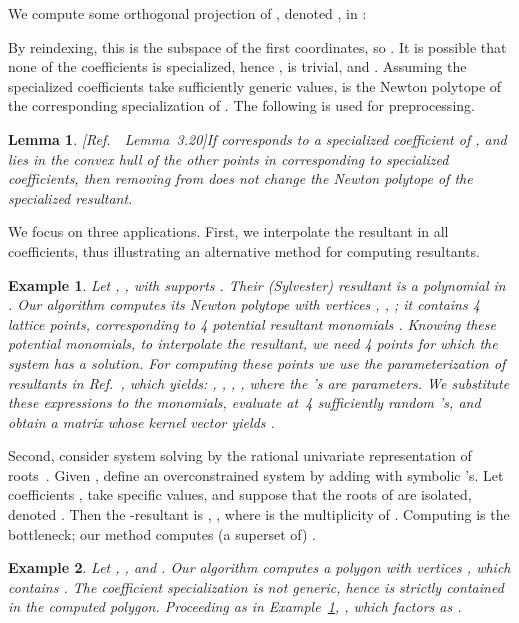 \documentclass{article}
\newtheorem{example}{Example}
\newtheorem{lemma}{Lemma}
\newcommand\refcite[1]{\citealp{#1}} \newcommand\citess[1]{\textsuperscript{\textup{\citealp{#1}}}}
\begin{document}
We compute some orthogonal projection of , denoted
, in :

By reindexing, this is the subspace of the first  coordinates,
so\linebreak
.
It is possible that none of the coefficients  is specialized,
hence ,  is trivial, and .
Assuming the specialized coefficients take sufficiently
generic values,  is the Newton polytope of the corresponding
specialization of .
The following is used for preprocessing.

\begin{lemma}{\rm [Ref.~\refcite{JensenYu11}~Lemma~3.20]}\label{Linsidepoints}
If  corresponds to a specialized coefficient of ,
and lies in the convex hull of the other points in  corresponding
to specialized coefficients, then removing  from  does not
change the Newton polytope of the specialized resultant.
\end{lemma} 

We focus on three applications. First,
we interpolate the resultant in all coefficients, thus illustrating
an alternative method for computing resultants.
\begin{example}\label{ExamGenRes}
Let , , with supports
.
Their (Sylvester) resultant is a polynomial in  .
Our algorithm computes its Newton polytope with vertices
,  , ;
it contains 4 lattice points, corresponding to 4 potential resultant monomials
.
Knowing these potential monomials, to interpolate the resultant, we need 4 
points 
for which the system  has a solution.
For computing these points we use the
parameterization 
of resultants in Ref.~\refcite{Kap91}, which yields:
,  ,
, , 
where the 's are parameters.
We substitute these expressions to the monomials,
evaluate at~4 sufficiently random 's, and obtain a matrix
whose kernel vector  yields
.
\end{example}

Second, consider system solving by the
rational univariate representation of roots~\citess{BaPoRo}. 
Given ,
define an overconstrained system by adding
 with symbolic 's.
Let coefficients , take specific values,
and suppose that the roots of  are isolated, denoted
.
Then the -resultant is
, 
, where  is the multiplicity of .
Computing  is the bottleneck; our method computes 
(a superset of) .

\begin{example}\label{ExamUres}
Let , , and .
Our algorithm computes a polygon with vertices 
, which contains . 
The coefficient specialization is not generic, hence  is
strictly contained in the computed polygon.
Proceeding as in Example~\ref{ExamGenRes},
, which factors as
.
\end{example} 
\end{document}
